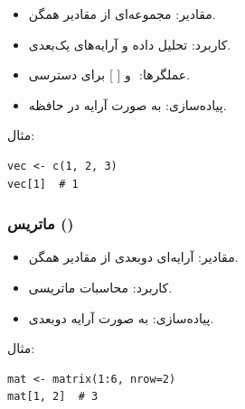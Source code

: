 \documentclass[11pt, a4paper, oneside]{book}
\begin{document}
					\begin{itemize}
						
						\item {\large مقادیر}:
						{\normalsize  مجموعه‌ای از مقادیر همگن.}
						
						\item {\large کاربرد}:
						{\normalsize تحلیل داده و آرایه‌های یک‌بعدی.}
						
						\item {\large عملگرها}:
						{\normalsize {}‌ و [ ] برای دسترسی.}
						
						\item {\large پیاده‌سازی}:
						{\normalsize به صورت آرایه در حافظه.}
						
					\end{itemize}
					
					مثال:
					
					\begin{latin}
						\begin{lstlisting}[caption={\lr{Vector data type}}] 
vec <- c(1, 2, 3)
vec[1]  # 1

						\end{lstlisting}
					\end{latin}
				
				
				
				\subsubsection{ماتریس ()}
					
					\begin{itemize}
						
						\item {\large مقادیر}:
						{\normalsize  آرایه‌ای دوبعدی از مقادیر همگن.}
						
						\item {\large کاربرد}:
						{\normalsize محاسبات ماتریسی.}
						
						\item {\large پیاده‌سازی}:
						{\normalsize به صورت آرایه دوبعدی.}
						
					\end{itemize}
					
					مثال:
					
					\begin{latin}
						\begin{lstlisting}[caption={\lr{Matrix data type}}] 
mat <- matrix(1:6, nrow=2)
mat[1, 2]  # 3

						\end{lstlisting}
					\end{latin}
				
\end{document}
